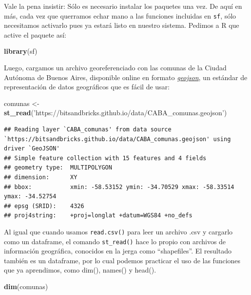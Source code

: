 \documentclass[spanish,]{book}
\newenvironment{Shaded}{\begin{snugshade}}{\end{snugshade}}
\newcommand{\KeywordTok}[1]{\textcolor[rgb]{0.13,0.29,0.53}{\textbf{#1}}}
\newcommand{\NormalTok}[1]{#1}
\newcommand{\StringTok}[1]{\textcolor[rgb]{0.31,0.60,0.02}{#1}}
\begin{document}
Vale la pena insistir: Sólo es necesario instalar los paquetes una vez. De aquí en más, cada vez que querramos echar mano a las funciones incluidas en \texttt{sf}, sólo necesitamos activarlo pues ya estará listo en nuestro sistema. Pedimos a R que active el paquete así:

\begin{Shaded}
\begin{Highlighting}[]
\KeywordTok{library}\NormalTok{(sf)}
\end{Highlighting}
\end{Shaded}

Luego, cargamos un archivo georeferenciado con las comunas de la Ciudad Autónoma de Buenos Aires, disponible online en formato \href{https://es.wikipedia.org/wiki/GeoJSON}{\emph{geojson}}, un estándar de representación de datos geográficos que es fácil de usar:

\begin{Shaded}
\begin{Highlighting}[]
\NormalTok{comunas <-}\StringTok{ }\KeywordTok{st_read}\NormalTok{(}\StringTok{'https://bitsandbricks.github.io/data/CABA_comunas.geojson'}\NormalTok{)}
\end{Highlighting}
\end{Shaded}

\begin{verbatim}
## Reading layer `CABA_comunas' from data source `https://bitsandbricks.github.io/data/CABA_comunas.geojson' using driver `GeoJSON'
## Simple feature collection with 15 features and 4 fields
## geometry type:  MULTIPOLYGON
## dimension:      XY
## bbox:           xmin: -58.53152 ymin: -34.70529 xmax: -58.33514 ymax: -34.52754
## epsg (SRID):    4326
## proj4string:    +proj=longlat +datum=WGS84 +no_defs
\end{verbatim}

Al igual que cuando usamos \texttt{read.csv()} para leer un archivo .csv y cargarlo como un dataframe, el comando \texttt{st\_read()} hace lo propio con archivos de información geográfica, conocidos en la jerga como ``shapefiles''. El resultado también es un dataframe, por lo cual podemos practicar el uso de las funciones que ya aprendimos, como dim(), names() y head().

\begin{Shaded}
\begin{Highlighting}[]
\KeywordTok{dim}\NormalTok{(comunas)}
\end{Highlighting}
\end{Shaded}
\end{document}
